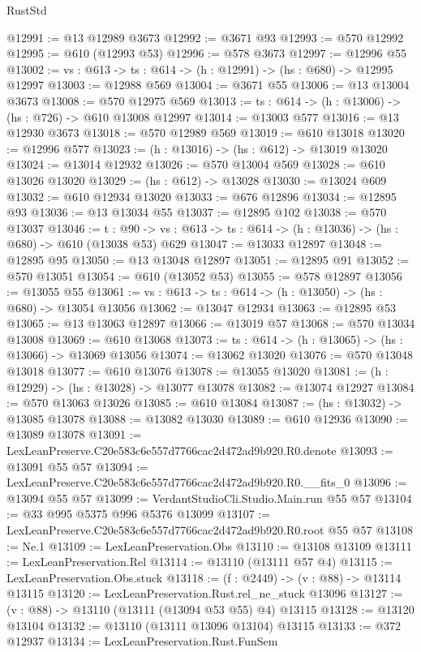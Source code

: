 \begin{lexlean}{RustStd}
\begin{coremodule}
@12991 := @13 @12989 @3673
@12992 := @3671 @93
@12993 := @570 @12992
@12995 := @610 (@12993 @53)
@12996 := @578 @3673
@12997 := @12996 @55
@13002 := {vs : @613} -> {ts : @614} -> (h : @12991) -> (hs : @680) -> @12995 @12997
@13003 := @12988 @569
@13004 := @3671 @55
@13006 := @13 @13004 @3673
@13008 := @570 @12975 @569
@13013 := {ts : @614} -> (h : @13006) -> (hs : @726) -> @610 @13008 @12997
@13014 := @13003 @577
@13016 := @13 @12930 @3673
@13018 := @570 @12989 @569
@13019 := @610 @13018
@13020 := @12996 @577
@13023 := (h : @13016) -> (hs : @612) -> @13019 @13020
@13024 := @13014 @12932
@13026 := @570 @13004 @569
@13028 := @610 @13026 @13020
@13029 := (hs : @612) -> @13028
@13030 := @13024 @609
@13032 := @610 @12934 @13020
@13033 := @676 @12896
@13034 := @12895 @93
@13036 := @13 @13034 @55
@13037 := @12895 @102
@13038 := @570 @13037
@13046 := {t : @90} ->
  {vs : @613} -> {ts : @614} -> (h : @13036) -> (hs : @680) -> @610 (@13038 @53) @629
@13047 := @13033 @12897
@13048 := @12895 @95
@13050 := @13 @13048 @12897
@13051 := @12895 @91
@13052 := @570 @13051
@13054 := @610 (@13052 @53)
@13055 := @578 @12897
@13056 := @13055 @55
@13061 := {vs : @613} -> {ts : @614} -> (h : @13050) -> (hs : @680) -> @13054 @13056
@13062 := @13047 @12934
@13063 := @12895 @53
@13065 := @13 @13063 @12897
@13066 := @13019 @57
@13068 := @570 @13034 @13008
@13069 := @610 @13068
@13073 := {ts : @614} -> (h : @13065) -> (hs : @13066) -> @13069 @13056
@13074 := @13062 @13020
@13076 := @570 @13048 @13018
@13077 := @610 @13076
@13078 := @13055 @13020
@13081 := (h : @12929) -> (hs : @13028) -> @13077 @13078
@13082 := @13074 @12927
@13084 := @570 @13063 @13026
@13085 := @610 @13084
@13087 := (hs : @13032) -> @13085 @13078
@13088 := @13082 @13030
@13089 := @610 @12936
@13090 := @13089 @13078
@13091 := LexLeanPreserve.C20e583c6e557d7766cac2d472ad9b920.R0.denote
@13093 := @13091 @55 @57
@13094 := LexLeanPreserve.C20e583c6e557d7766cac2d472ad9b920.R0.__fits_0
@13096 := @13094 @55 @57
@13099 := VerdantStudioCli.Studio.Main.run @55 @57
@13104 := @33 @995 @5375 @996 @5376 @13099
@13107 := LexLeanPreserve.C20e583c6e557d7766cac2d472ad9b920.R0.root @55 @57
@13108 := Ne.{1}
@13109 := LexLeanPreservation.Obs
@13110 := @13108 @13109
@13111 := LexLeanPreservation.Rel
@13114 := @13110 (@13111 @57 @4)
@13115 := LexLeanPreservation.Obs.stuck
@13118 := (f : @2449) -> (v : @88) -> @13114 @13115
@13120 := LexLeanPreservation.Rust.rel_ne_stuck @13096
@13127 := (v : @88) -> @13110 (@13111 (@13094 @53 @55) @4) @13115
@13128 := @13120 @13104
@13132 := @13110 (@13111 @13096 @13104) @13115
@13133 := @372 @12937
@13134 := LexLeanPreservation.Rust.FunSem

\end{coremodule}
\end{lexlean}
